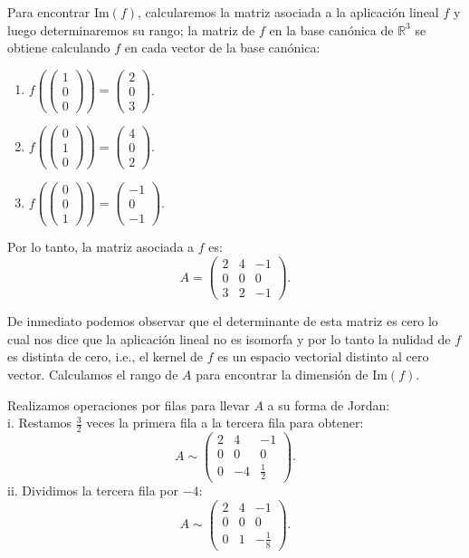 \documentclass{article}
\begin{document}
Para encontrar \( \text{Im}(f) \), calcularemos la matriz asociada a la aplicación lineal \( f \) y luego determinaremos su rango; la matriz de \( f \) en la base canónica de \( \mathbb{R}^3 \) se obtiene calculando \( f \) en cada vector de la base canónica:
\begin{enumerate}
\item \( f\left( \begin{pmatrix} 1 \\ 0 \\ 0 \end{pmatrix} \right) = \begin{pmatrix} 2 \\ 0 \\ 3 \end{pmatrix} \).
\item \( f\left( \begin{pmatrix} 0 \\ 1 \\ 0 \end{pmatrix} \right) = \begin{pmatrix} 4 \\ 0 \\ 2 \end{pmatrix} \).
\item \( f\left( \begin{pmatrix} 0 \\ 0 \\ 1 \end{pmatrix} \right) = \begin{pmatrix} -1 \\ 0 \\ -1 \end{pmatrix} \).
\end{enumerate}

Por lo tanto, la matriz asociada a \( f \) es:
\[
A = \begin{pmatrix} 2 & 4 & -1 \\ 0 & 0 & 0 \\ 3 & 2 & -1 \end{pmatrix}.
\]

De inmediato podemos observar que el determinante de esta matriz es cero lo cual nos dice que la aplicación lineal no es isomorfa y por lo tanto la nulidad de $f$ es distinta de cero, i.e., el kernel de $f$ es un espacio vectorial distinto al cero vector. Calculamos el rango de \( A \) para encontrar la dimensión de \( \text{Im}(f) \).

Realizamos operaciones por filas para llevar \( A \) a su forma de Jordan: \\
i. Restamos \( \frac{3}{2} \) veces la primera fila a la tercera fila para obtener:
   \[
   A \sim \begin{pmatrix} 2 & 4 & -1 \\ 0 & 0 & 0 \\ 0 & -4 & \frac{1}{2} \end{pmatrix}.
   \]
ii. Dividimos la tercera fila por \( -4 \):
   \[
   A \sim \begin{pmatrix} 2 & 4 & -1 \\ 0 & 0 & 0 \\ 0 & 1 & -\frac{1}{8} \end{pmatrix}.
   \]
\end{document}
